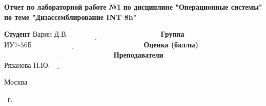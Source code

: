 \begin{titlepage}
	\begin{center}
		\noindent\begin{minipage}{1.3\textwidth}\centering
			\Large\textbf{  Отчет по лабораторной работе №1}\newline
			\textbf{по дисциплине "Операционные системы"}\newline
			\textbf{по теме "Дизассемблирование INT 8h"}\newline\newline
		\end{minipage}
	\end{center}
	
	\noindent\textbf{Студент} $\underline{\text{Варин Д.В.~~~~~~~~~~~~~~~~~~~~~~~~~~~~~~~~~~~~~~}}$\newline\newline
	\noindent\textbf{Группа} $\underline{\text{ИУ7-56Б~~~~~~~~~~~~~~~~~~~~~~~~~~~~~~~~~~~~~~~~~~~~~~}}$\newline\newline
	\noindent\textbf{Оценка (баллы)} $\underline{\text{~~~~~~~~~~~~~~~~~~~~~~~~~~~~~~~~~~~~~~~~~~~~~}}$\newline\newline
	\noindent\textbf{Преподаватели} $\underline{\text{Рязанова Н.Ю.~~~~~~~~~~~~~~~~~~~~~~~~~~}}$\newline\newline\newline
	
	\bgroup 
	\centering
		\vfill
		
		Москва
		
		\the\year
		~г.

	\egroup 
\end{titlepage}